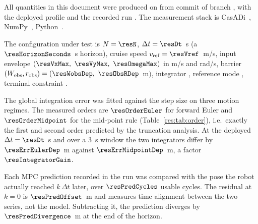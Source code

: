 
All quantities in this document were produced on \resDate from commit \texttt{\resCommit} of branch \texttt{\resBranch}, with the deployed profile \resProfile and the recorded run \resBag. The measurement stack is CasADi~\resCasadi, NumPy~\resNumpy, Python~\resPython.

The configuration under test is $N=\resN$, $\Delta t=\resDt$~s (a $\resHorizonSeconds$~s horizon), cruise speed $v_{\mathrm{ref}}=\resVref$~m/s, input envelope $(\resVxMax,\ \resVyMax,\ \resOmegaMax)$ in m/s and rad/s, barrier $(\Wobs,\robs)=(\resWobsDep,\ \resObsRDep$~m$)$, integrator \texttt{\resIntegrator}, reference mode \texttt{\resPathMode}, terminal constraint \texttt{\resTerminalMode}.




\label{res:disc}


The global integration error was fitted against the step size on three motion regimes. The measured orders are $\resOrderEuler$ for forward Euler and $\resOrderMidpoint$ for the mid-point rule (Table~\ref{res:tab:order}), i.e.\ exactly the first and second order predicted by the truncation analysis. At the deployed $\Delta t=\resDt$~s and over a $3$~s window the two integrators differ by $\resErrEulerDep$~m against $\resErrMidpointDep$~m, a factor $\resIntegratorGain$.



\label{res:pred}


Each MPC prediction recorded in the run was compared with the pose the robot actually reached $k\,\Delta t$ later, over $\resPredCycles$ usable cycles. The residual at $k=0$ is $\resPredOffset$~m and measures time alignment between the two series, not the model. Subtracting it, the prediction diverges by $\resPredDivergence$~m at the end of the horizon.

